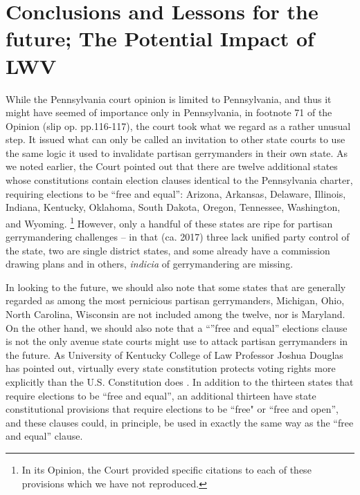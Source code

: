     \section{Conclusions and Lessons for the future; The Potential Impact of LWV}
    While the Pennsylvania court opinion is limited to Pennsylvania, and thus it might have seemed of importance only in Pennsylvania, in footnote 71 of the Opinion (slip op. pp.116-117), the court took what we regard as a rather unusual step. It issued what can only be called an invitation to other state courts to use the same logic it used to invalidate partisan gerrymanders in their own state. As we noted earlier, the Court pointed out that there are twelve additional states whose constitutions contain election clauses identical to the Pennsylvania charter, requiring elections to be ``free and equal”: Arizona, Arkansas, Delaware, Illinois, Indiana, Kentucky, Oklahoma, South Dakota, Oregon, Tennessee, Washington, and Wyoming.
        \footnote{In its Opinion, the Court provided specific citations to each of these provisions which we have not reproduced.}
    However, only a handful of these states are ripe for partisan gerrymandering challenges -- in that (ca. 2017) three lack unified party control of the state, two are single district states, and some already have a commission drawing plans and in others, \textit{indicia} of gerrymandering are missing.
\par
    In looking to the future, we should also note that some states that are generally regarded as among the most pernicious partisan gerrymanders, Michigan, Ohio, North Carolina, Wisconsin are not included among the twelve, nor is Maryland. On the other hand, we should also note that a ``''free and equal” elections clause is not the only avenue state courts might use to attack partisan gerrymanders in the future. As University of Kentucky College of Law Professor Joshua Douglas has pointed out, virtually every state constitution protects voting rights more explicitly than the U.S. Constitution does \citep{Douglas2014_RightToVote}. In addition to the thirteen states that require elections to be ``free and equal”, an additional thirteen have state constitutional provisions that require elections to be ``free" or ``free and open”, and these clauses could, in principle, be used in exactly the same way as the ``free and equal” clause. 
